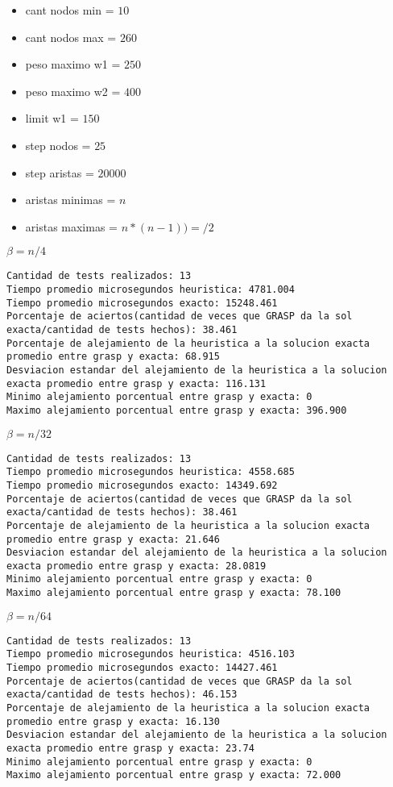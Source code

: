 \begin{itemize}
	\item cant nodos min = $10$
	\item cant nodos max = $260$
	\item peso maximo w1 = $250$
	\item peso maximo w2 = $400$
	\item limit w1 = $150$
	\item step nodos = $25$
	\item step aristas = $20000$
	\item aristas minimas = $n$
	\item aristas maximas = $n * (n-1))=/2$
\end{itemize}


$\beta= n/4$
\begin{lstlisting}[frame=single]
Cantidad de tests realizados: 13
Tiempo promedio microsegundos heuristica: 4781.004
Tiempo promedio microsegundos exacto: 15248.461
Porcentaje de aciertos(cantidad de veces que GRASP da la sol exacta/cantidad de tests hechos): 38.461
Porcentaje de alejamiento de la heuristica a la solucion exacta promedio entre grasp y exacta: 68.915
Desviacion estandar del alejamiento de la heuristica a la solucion exacta promedio entre grasp y exacta: 116.131
Minimo alejamiento porcentual entre grasp y exacta: 0
Maximo alejamiento porcentual entre grasp y exacta: 396.900
\end{lstlisting}
$\beta=n/32$
\begin{lstlisting}[frame=single]
Cantidad de tests realizados: 13
Tiempo promedio microsegundos heuristica: 4558.685
Tiempo promedio microsegundos exacto: 14349.692
Porcentaje de aciertos(cantidad de veces que GRASP da la sol exacta/cantidad de tests hechos): 38.461
Porcentaje de alejamiento de la heuristica a la solucion exacta promedio entre grasp y exacta: 21.646
Desviacion estandar del alejamiento de la heuristica a la solucion exacta promedio entre grasp y exacta: 28.0819
Minimo alejamiento porcentual entre grasp y exacta: 0
Maximo alejamiento porcentual entre grasp y exacta: 78.100
\end{lstlisting}
$\beta=n/64$
\begin{lstlisting}[frame=single]
Cantidad de tests realizados: 13
Tiempo promedio microsegundos heuristica: 4516.103
Tiempo promedio microsegundos exacto: 14427.461
Porcentaje de aciertos(cantidad de veces que GRASP da la sol exacta/cantidad de tests hechos): 46.153
Porcentaje de alejamiento de la heuristica a la solucion exacta promedio entre grasp y exacta: 16.130
Desviacion estandar del alejamiento de la heuristica a la solucion exacta promedio entre grasp y exacta: 23.74
Minimo alejamiento porcentual entre grasp y exacta: 0
Maximo alejamiento porcentual entre grasp y exacta: 72.000
\end{lstlisting}


